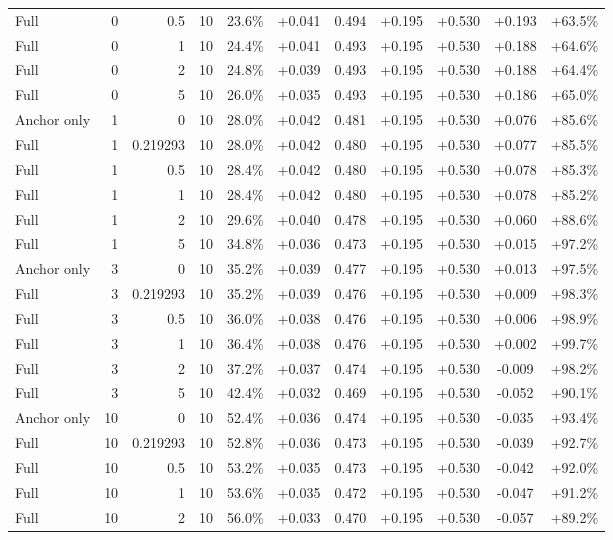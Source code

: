 \begin{table}[htbp]
\begin{tabular}{lrrrccccccc}
Full & 0 & 0.5 & 10 & 23.6\% & +0.041 & 0.494 & +0.195 & +0.530 & +0.193 & +63.5\% \\
Full & 0 & 1 & 10 & 24.4\% & +0.041 & 0.493 & +0.195 & +0.530 & +0.188 & +64.6\% \\
Full & 0 & 2 & 10 & 24.8\% & +0.039 & 0.493 & +0.195 & +0.530 & +0.188 & +64.4\% \\
Full & 0 & 5 & 10 & 26.0\% & +0.035 & 0.493 & +0.195 & +0.530 & +0.186 & +65.0\% \\
Anchor only & 1 & 0 & 10 & 28.0\% & +0.042 & 0.481 & +0.195 & +0.530 & +0.076 & +85.6\% \\
Full & 1 & 0.219293 & 10 & 28.0\% & +0.042 & 0.480 & +0.195 & +0.530 & +0.077 & +85.5\% \\
Full & 1 & 0.5 & 10 & 28.4\% & +0.042 & 0.480 & +0.195 & +0.530 & +0.078 & +85.3\% \\
Full & 1 & 1 & 10 & 28.4\% & +0.042 & 0.480 & +0.195 & +0.530 & +0.078 & +85.2\% \\
Full & 1 & 2 & 10 & 29.6\% & +0.040 & 0.478 & +0.195 & +0.530 & +0.060 & +88.6\% \\
Full & 1 & 5 & 10 & 34.8\% & +0.036 & 0.473 & +0.195 & +0.530 & +0.015 & +97.2\% \\
Anchor only & 3 & 0 & 10 & 35.2\% & +0.039 & 0.477 & +0.195 & +0.530 & +0.013 & +97.5\% \\
Full & 3 & 0.219293 & 10 & 35.2\% & +0.039 & 0.476 & +0.195 & +0.530 & +0.009 & +98.3\% \\
Full & 3 & 0.5 & 10 & 36.0\% & +0.038 & 0.476 & +0.195 & +0.530 & +0.006 & +98.9\% \\
Full & 3 & 1 & 10 & 36.4\% & +0.038 & 0.476 & +0.195 & +0.530 & +0.002 & +99.7\% \\
Full & 3 & 2 & 10 & 37.2\% & +0.037 & 0.474 & +0.195 & +0.530 & -0.009 & +98.2\% \\
Full & 3 & 5 & 10 & 42.4\% & +0.032 & 0.469 & +0.195 & +0.530 & -0.052 & +90.1\% \\
Anchor only & 10 & 0 & 10 & 52.4\% & +0.036 & 0.474 & +0.195 & +0.530 & -0.035 & +93.4\% \\
Full & 10 & 0.219293 & 10 & 52.8\% & +0.036 & 0.473 & +0.195 & +0.530 & -0.039 & +92.7\% \\
Full & 10 & 0.5 & 10 & 53.2\% & +0.035 & 0.473 & +0.195 & +0.530 & -0.042 & +92.0\% \\
Full & 10 & 1 & 10 & 53.6\% & +0.035 & 0.472 & +0.195 & +0.530 & -0.047 & +91.2\% \\
Full & 10 & 2 & 10 & 56.0\% & +0.033 & 0.470 & +0.195 & +0.530 & -0.057 & +89.2\% \\

\end{tabular}
\end{table}

